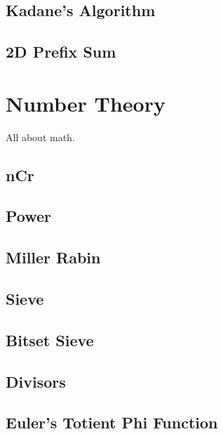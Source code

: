 \documentclass[10pt, a4paper]{article}
\begin{document}
\begin{multicols}{2}
\subsection{Kadane’s Algorithm}


\subsection{2D Prefix Sum}


\section{Number Theory}
All about math.

\subsection{nCr}


\subsection{Power}


\subsection{Miller Rabin}


\subsection{Sieve}


\subsection{Bitset Sieve}


\subsection{Divisors}


\subsection{Euler's Totient Phi Function}



\end{multicols}
\end{document}
